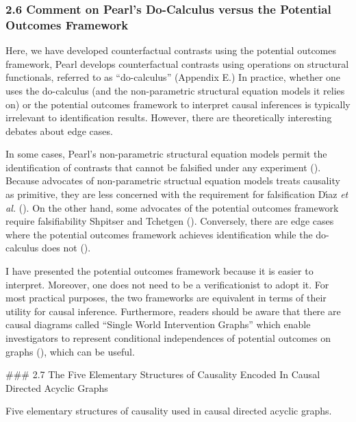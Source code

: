 \documentclass[
  single column]{article}
\begin{document}
\subsubsection{2.6 Comment on Pearl's Do-Calculus versus the Potential
Outcomes
Framework}\label{comment-on-pearls-do-calculus-versus-the-potential-outcomes-framework}

Here, we have developed counterfactual contrasts using the potential
outcomes framework, Pearl develops counterfactual contrasts using
operations on structural functionals, referred to as ``do-calculus''
(Appendix E.) In practice, whether one uses the do-calculus (and the
non-parametric structural equation models it relies on) or the potential
outcomes framework to interpret causal inferences is typically
irrelevant to identification results. However, there are theoretically
interesting debates about edge cases.

In some cases, Pearl's non-parametric structural equation models permit
the identification of contrasts that cannot be falsified under any
experiment ().
Because advocates of non-parametric structual equation models treats
causality as primitive, they are less concerned with the requirement for
falsification Dı́az \emph{et al.} (). On the
other hand, some advocates of the potential outcomes framework require
falsifiability Shpitser and Tchetgen
(). Conversely, there are edge
cases where the potential outcomes framework achieves identification
while the do-calculus does not ().

I have presented the potential outcomes framework because it is easier
to interpret. Moreover, one does not need to be a verificationist to
adopt it. For most practical purposes, the two frameworks are equivalent
in terms of their utility for causal inference. Furthermore, readers
should be aware that there are causal diagrams called ``Single World
Intervention Graphs'' which enable investigators to represent
conditional independences of potential outcomes on graphs
(),
which can be useful.

\#\#\# 2.7 The Five Elementary Structures of Causality Encoded In Causal
Directed Acyclic Graphs

\begin{table}

\caption{\label{tbl-fiveelementary}Five elementary structures of
causality used in causal directed acyclic graphs.}

\centering{

\terminologydirectedgraph

}

\end{table}%
\end{document}
